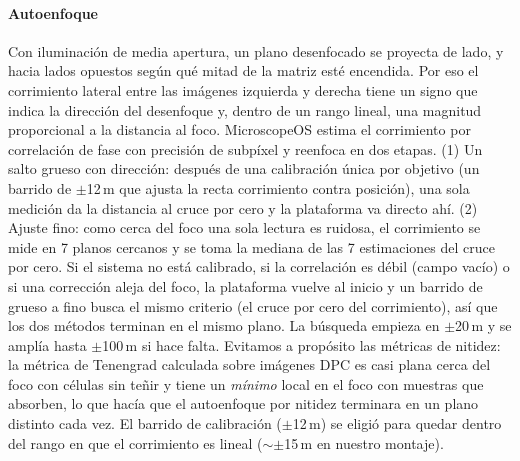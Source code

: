 \documentclass[preprint,12pt]{elsarticle}
\newcommand{\um}{\,\textmu m}
\begin{document}
\paragraph{Autoenfoque} Con iluminación de media apertura, un plano
desenfocado se proyecta de lado, y hacia lados opuestos según qué mitad de
la matriz esté encendida. Por eso el corrimiento lateral entre las imágenes
izquierda y derecha tiene un signo que indica la dirección del desenfoque y,
dentro de un rango lineal, una magnitud proporcional a la distancia al
foco. MicroscopeOS estima el corrimiento por correlación de fase con
precisión de subpíxel y reenfoca en dos etapas. (1) Un salto grueso con
dirección: después de una calibración única por objetivo (un barrido de
$\pm$12\um{} que ajusta la recta corrimiento contra posición), una sola
medición da la distancia al cruce por cero y la plataforma va directo
ahí. (2) Ajuste fino: como cerca del foco una sola lectura es ruidosa, el
corrimiento se mide en 7 planos cercanos y se toma la mediana de las 7
estimaciones del cruce por cero. Si el sistema no está calibrado, si la
correlación es débil (campo vacío) o si una corrección aleja del foco, la
plataforma vuelve al inicio y un barrido de grueso a fino busca el mismo
criterio (el cruce por cero del corrimiento), así que los dos métodos
terminan en el mismo plano. La búsqueda empieza en $\pm$20\um{} y se
amplía hasta $\pm$100\um{} si hace falta. Evitamos a propósito las
métricas de nitidez: la métrica de Tenengrad calculada sobre imágenes DPC
es casi plana cerca del foco con células sin teñir y tiene un
\emph{mínimo} local en el foco con muestras que absorben, lo que hacía que
el autoenfoque por nitidez terminara en un plano distinto cada vez. El
barrido de calibración ($\pm$12\um) se eligió para quedar dentro del rango
en que el corrimiento es lineal ($\sim\pm$15\um{} en nuestro montaje).
\end{document}
